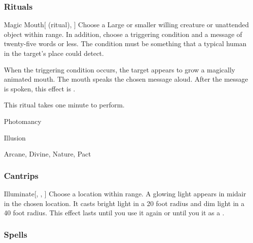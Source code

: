 \subsubsection{Rituals}


\lowercase{\hypertarget{spell:Magic Mouth}{}}\label{spell:Magic Mouth}
\begin{attuneability}[\nth{1}]{\hypertarget{spell:Magic Mouth}{Magic Mouth}}[ (ritual), ]
Choose a Large or smaller willing creature or unattended object within \rngclose range.
In addition, choose a triggering condition and a message of twenty-five words or less.
The condition must be something that a typical human in the target's place could detect.

When the triggering condition occurs, the target appears to grow a magically animated mouth.
The mouth speaks the chosen message aloud.
After the message is spoken, this effect is .

This ritual takes one minute to perform.
\end{attuneability}
\vspace{0.25em}


\newpage
\begin{spellsection}{Photomancy}

\begin{spellheader}
\end{spellheader}


 Illusion

 Arcane, Divine, Nature, Pact

\subsubsection{Cantrips}


\begin{apability}{Illuminate}[, , ]
Choose a location within \rngmed range.
A glowing light appears in midair in the chosen location.
It casts bright light in a 20 foot radius and dim light in a 40 foot radius.
This effect lasts until you use it again or until you  it as a .
\end{apability}

\end{spellsection}


\subsubsection{Spells}



